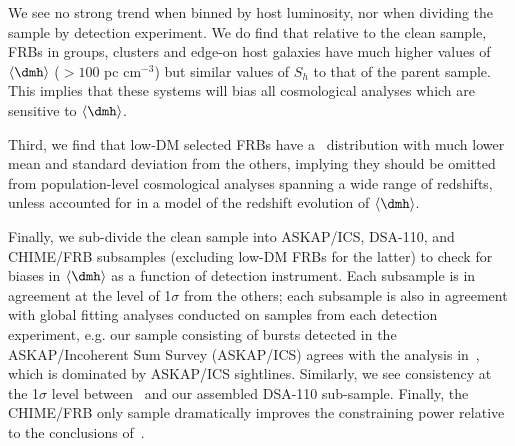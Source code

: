We see no strong trend when binned by host luminosity, nor when dividing the sample by detection experiment. We do find that relative to the clean sample, FRBs in groups, clusters and edge-on host galaxies have much higher values of $\langle \dmh\rangle$ ($> 100$ pc cm$^{-3}$) but similar values of $S_h$ to that of the parent sample. This implies that these systems will bias all cosmological analyses which are sensitive to $\langle\dmh\rangle$.

Third, we find that low-DM selected FRBs have a \dmh\ distribution with much lower mean and standard deviation from the others, implying they should be omitted from population-level cosmological analyses spanning a wide range of redshifts, unless accounted for in a model of the redshift evolution of $\langle\dmh\rangle$. 

Finally, we sub-divide the clean sample into ASKAP/ICS, DSA-110, and CHIME/FRB subsamples (excluding low-DM FRBs for the latter) to check for biases in $\langle\dmh\rangle$ as a function of detection instrument. Each subsample is in agreement at the level of 1$\sigma$ from the others; each subsample is also in agreement with global fitting analyses conducted on samples from each detection experiment, e.g. our sample consisting of bursts detected in the ASKAP/Incoherent Sum Survey (ASKAP/ICS) agrees with the analysis in~\citet{james2021z}, which is dominated by ASKAP/ICS sightlines. Similarly, we see consistency at the 1$\sigma$ level between~\citet{connor2024gas} and our assembled DSA-110 sub-sample. Finally, the CHIME/FRB only sample dramatically improves the constraining power relative to the conclusions of~\citet{shin2023inferring}.


